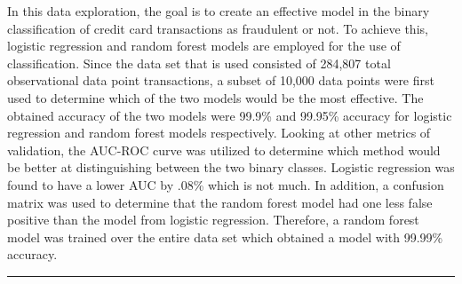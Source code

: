 \documentclass[
]{article}
\begin{document}
In this data exploration, the goal is to create an effective model in
the binary classification of credit card transactions as fraudulent or
not. To achieve this, logistic regression and random forest models are
employed for the use of classification. Since the data set that is used
consisted of 284,807 total observational data point transactions, a
subset of 10,000 data points were first used to determine which of the
two models would be the most effective. The obtained accuracy of the two
models were 99.9\% and 99.95\% accuracy for logistic regression and
random forest models respectively. Looking at other metrics of
validation, the AUC-ROC curve was utilized to determine which method
would be better at distinguishing between the two binary classes.
Logistic regression was found to have a lower AUC by .08\% which is not
much. In addition, a confusion matrix was used to determine that the
random forest model had one less false positive than the model from
logistic regression. Therefore, a random forest model was trained over
the entire data set which obtained a model with 99.99\% accuracy.

\begin{center}\rule{0.5\linewidth}{0.5pt}\end{center}
\end{document}
